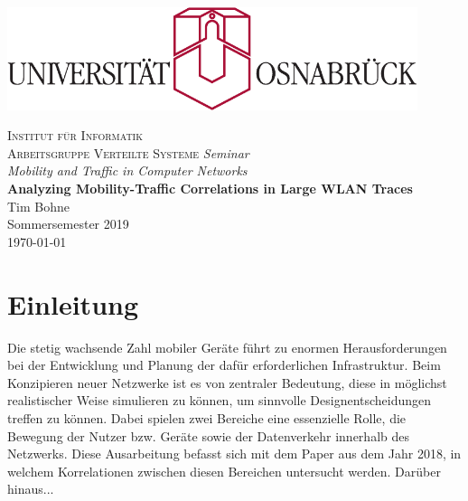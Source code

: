 \documentclass[12pt, a4paper]{article}
\begin{document}

\begin{titlepage}
\centering
\thispagestyle{empty}
\begin{center}
\includegraphics[width=0.9\textwidth]{uos.pdf}
\end{center}
\LARGE{\textsc{Institut für Informatik\\Arbeitsgruppe Verteilte Systeme}}
\vfill
\LARGE{\emph{Seminar}}\\
\LARGE{\emph{Mobility and Traffic in Computer Networks}}\\
\vspace{8mm}
\huge{\textbf{{\selectfont
Analyzing Mobility-Traffic Correlations in Large WLAN Traces}}}\\
\vspace{9mm}
\LARGE{Tim Bohne}\\
\vspace{0.2cm}
\vspace{4cm}
\large{Sommersemester 2019}\\
\vspace{0.2cm}
\large{\today}
\vfill
\end{titlepage}
\newpage

\tableofcontents
\newpage

\pagestyle{plain}

\section{Einleitung}

Die stetig wachsende Zahl mobiler Geräte führt zu enormen Herausforderungen bei der Entwicklung
und Planung der dafür erforderlichen Infrastruktur. Beim Konzipieren neuer Netzwerke ist es von zentraler
Bedeutung, diese in möglichst realistischer Weise simulieren zu können, um sinnvolle Designentscheidungen
treffen zu können. Dabei spielen zwei Bereiche eine essenzielle Rolle, die Bewegung der Nutzer bzw. Geräte
sowie der Datenverkehr innerhalb des Netzwerks.\newline\newline
Diese Ausarbeitung befasst sich mit dem Paper  \cite{Alipour2018} aus dem Jahr 2018, in welchem Korrelationen
zwischen diesen Bereichen untersucht werden. Darüber hinaus...\newline\newline
\end{document}
